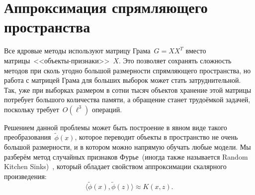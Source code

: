 \documentclass[12pt,fleqn]{article}
\begin{document}
\section{Аппроксимация спрямляющего пространства}

Все ядровые методы используют матрицу Грама~$G = X X^T$ вместо
матрицы~<<объекты-признаки>>~$X$.
Это позволяет сохранять сложность методов при сколь
угодно большой размерности спрямляющего пространства,
но работа с матрицей Грама для больших выборок может стать затруднительной.
Так, уже при выборках размером в сотни тысяч объектов хранение этой матрицы
потребует большого количества памяти, а обращение станет трудоёмкой задачей,
поскольку требует~$O(\ell^3)$ операций.

Решением данной проблемы может быть построение в явном виде такого преобразования~$\tilde \phi(x)$,
которое переводит объекты в пространство не очень большой размерности,
и в котором можно напрямую обучать любые модели.
Мы разберём метод случайных признаков Фурье~(иногда также называется Random Kitchen Sinks)~\cite{rahimi07rks},
который обладает свойством аппроксимации скалярного произведения:
\[
    \langle \tilde \phi(x), \tilde \phi(z) \rangle
    \approx
    K(x, z).
\]

\end{document}
